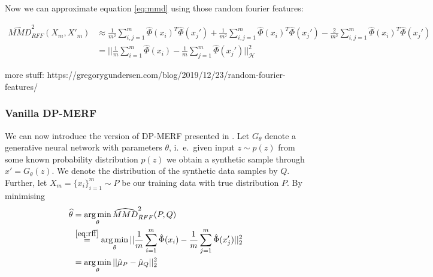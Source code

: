 Now we can approximate equation \ref{eq:mmd} using those random fourier features:

\begin{align} \label{eq:rff}
    \widehat{MMD}^2_{RFF}(X_m, X'_m) &\approx \frac{1}{m^2} \sum_{i,j=1}^m \hat{\Phi}(x_i)^T \hat{\Phi}(x_j') + \frac{1}{m^2} \sum_{i,j=1}^m \hat{\Phi}(x_i)^T \hat{\Phi}(x_j') - \frac{2}{m^2} \sum_{i,j=1}^m \hat{\Phi}(x_i)^T \hat{\Phi}(x_j') \nonumber \\
    &= || \frac{1}{m} \sum_{i=1}^m \hat{\Phi}(x_i) - \frac{1}{m} \sum_{j=1}^m \hat{\Phi}(x_j') ||_\mathcal{H}^2
\end{align}

more stuff: https://gregorygundersen.com/blog/2019/12/23/random-fourier-features/

\subsubsection{Vanilla DP-MERF}
We can now introduce the version of DP-MERF presented in \parencite{dpmerf}. Let $G_\theta$ denote a generative neural network with parameters $\theta$, i.\ e.\ given input $z \sim p(z)$ from some known probability distribution $p(z)$ we obtain a synthetic sample through $x' = G_\theta(z)$. We denote the distribution of the synthetic data samples by $Q$. Further, let $X_m = \{x_i\}_{i=1}^m \sim P$ be our training data with true distribution $P$. By minimising 
\begin{align}
    \widehat{\theta} &= \operatorname*{arg\,min}_\theta \widehat{MMD}^2_{RFF}(P, Q) \nonumber \\
    &\overset{\ref{eq:rff}}{=} \operatorname*{arg\,min}_\theta || \frac{1}{m} \sum_{i=1}^m \hat{\Phi}(x_i) - \frac{1}{m} \sum_{j=1}^m \hat{\Phi}(x_j') ||_2^2 \nonumber \\
    &= \operatorname*{arg\,min}_\theta || \hat{\mu}_P - \hat{\mu}_Q ||_2^2
\end{align}

